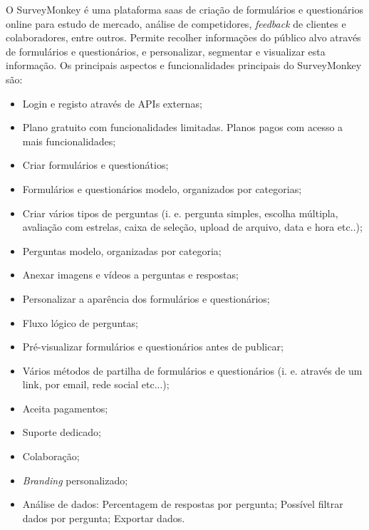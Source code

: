 O SurveyMonkey é uma plataforma \acrfull{saas} de criação de formulários e questionários online para estudo de mercado, análise de competidores, \textit{feedback} de clientes e colaboradores, entre outros. Permite recolher informações do público alvo através de formulários e questionários, e personalizar, segmentar e visualizar esta informação.
Os principais aspectos e funcionalidades principais do SurveyMonkey são:
\begin{itemize}
	\setlength{\itemsep}{1pt}
	\item Login e registo através de APIs externas;
	\item Plano gratuito com funcionalidades limitadas. Planos pagos com acesso a mais funcionalidades;
	\item Criar formulários e questionátios;
	\item Formulários e questionários modelo, organizados por categorias;
	\item Criar vários tipos de perguntas (i. e. pergunta simples, escolha múltipla, avaliação com estrelas, caixa de seleção, upload de arquivo, data e hora etc..);
	\item Perguntas modelo, organizadas por categoria;
	\item Anexar imagens e vídeos a perguntas e respostas;
	\item Personalizar a aparência dos formulários e questionários;
	\item Fluxo lógico de perguntas;
	\item Pré-visualizar formulários e questionários antes de publicar;
	\item Vários métodos de partilha de formulários e questionários (i. e. através de um link, por email, rede social etc...);
	\item Aceita pagamentos;
	\item Suporte dedicado;
	\item Colaboração;
	\item \textit{Branding} personalizado;
	\item Análise de dados:
		\subitem Percentagem de respostas por pergunta;
		\subitem Possível filtrar dados por pergunta;
		\subitem Exportar dados.
		
\end{itemize}

